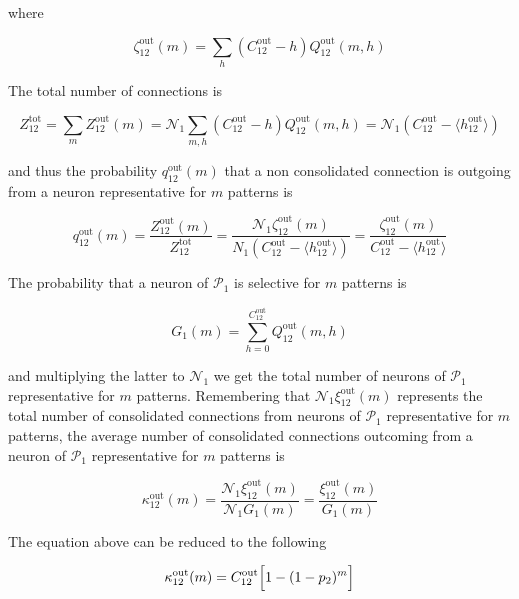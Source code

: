 \documentclass[a4paper, 12pt, twoside, openright]{book}
\newcommand{\popI}{\mathcal{P}_1}
\newcommand{\NI}{\mathcal{N}_1}
\begin{document}
where

\begin{equation}
     \zeta_{12}^\text{out} (m) =
     \sum_{h}  
     (C_{12}^\text{out} - h)Q_{12}^\text{out}(m,h) 
\end{equation}

The total number of connections is 

\begin{equation}
     Z_{12}^\text{tot} = \sum_{m} Z_{12}^\text{out}(m) = \NI \sum_{m,h} (C_{12}^\text{out} - h) Q_{12}^\text{out}(m,h) = \NI (C_{12}^\text{out} - \langle h_{12}^\text{out} \rangle)
\end{equation}

and thus the probability $q_{12}^\text{out}(m)$ that a non consolidated connection is outgoing from a neuron representative for $m$ patterns is

\begin{equation}
    q_{12}^\text{out}(m) = \frac{Z_{12}^\text{out}(m)}{Z_{12}^\text{tot}} =
    \frac{\NI \zeta_{12}^\text{out} (m)}{N_1 (C_{12}^\text{out}-\langle h_{12}^\text{out} \rangle)}= \frac{\zeta_{12}^\text{out} (m)}{C_{12}^\text{out}-\langle h_{12}^\text{out} \rangle}
\end{equation}

The probability that a neuron of $\popI$ is selective for $m$ patterns is

\begin{equation}
    G_1(m) = \sum_{h=0}^{C_{12}^\text{out}} Q_{12}^\text{out}(m,h)
\end{equation}

and multiplying the latter to $\NI$ we get the total number of neurons of $\popI$ representative for $m$ patterns. Remembering that $\NI \xi_{12}^\text{out}(m)$ represents the total number of consolidated connections from neurons of $\popI$ representative for $m$ patterns, the average number of consolidated connections outcoming from a neuron of $\popI$ representative for $m$ patterns is

\begin{equation}
\label{eq:kout_m_T}
    \kappa_{12}^\text{out} (m)= \frac{\NI \xi_{12}^\text{out}(m)}{\NI G_1(m)}
    = \frac{\xi_{12}^\text{out}(m)}{G_1(m)}
\end{equation}

The equation above can be reduced to the following

\begin{equation}
    \kappa_{12}^\text{out} (m)=C_{12}^\text{out} \Bigl[ 1- (1-p_2)^m\Bigr]
\end{equation}
\end{document}
